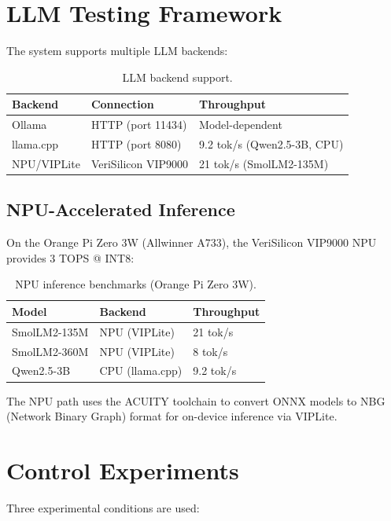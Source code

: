 \documentclass[11pt]{article}
\begin{document}
\section{LLM Testing Framework}

The system supports multiple LLM backends:

\begin{table}[ht]
\centering
\caption{LLM backend support.}
\label{tab:backends}
\begin{tabular}{lll}
\toprule
Backend & Connection & Throughput \\
\midrule
Ollama & HTTP (port 11434) & Model-dependent \\
llama.cpp & HTTP (port 8080) & 9.2 tok/s (Qwen2.5-3B, CPU) \\
NPU/VIPLite & VeriSilicon VIP9000 & 21 tok/s (SmolLM2-135M) \\
\bottomrule
\end{tabular}
\end{table}

\subsection{NPU-Accelerated Inference}

On the Orange Pi Zero 3W (Allwinner A733), the VeriSilicon VIP9000 NPU provides 3 TOPS @ INT8:

\begin{table}[ht]
\centering
\caption{NPU inference benchmarks (Orange Pi Zero 3W).}
\label{tab:npu}
\begin{tabular}{lll}
\toprule
Model & Backend & Throughput \\
\midrule
SmolLM2-135M & NPU (VIPLite) & 21 tok/s \\
SmolLM2-360M & NPU (VIPLite) & 8 tok/s \\
Qwen2.5-3B & CPU (llama.cpp) & 9.2 tok/s \\
\bottomrule
\end{tabular}
\end{table}

The NPU path uses the ACUITY toolchain to convert ONNX models to NBG (Network Binary Graph) format for on-device inference via VIPLite.

\section{Control Experiments}

Three experimental conditions are used:
\end{document}
